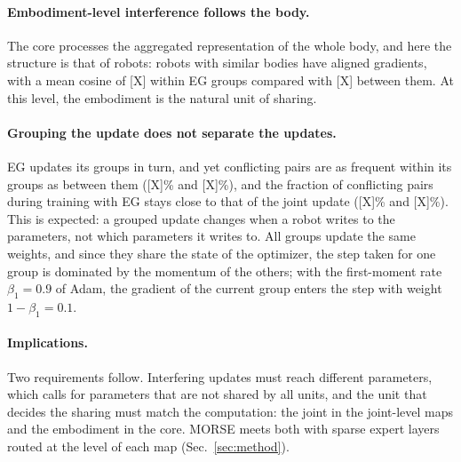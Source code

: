 \paragraph{Embodiment-level interference follows the body.}
The core processes the aggregated representation of the whole body, and here the structure is that of robots: robots
with similar bodies have aligned gradients, with a mean cosine of [X] within EG groups compared with [X] between them.
At this level, the embodiment is the natural unit of sharing.

\paragraph{Grouping the update does not separate the updates.}
EG updates its groups in turn, and yet conflicting pairs are as frequent within its groups as between them ([X]\% and
[X]\%), and the fraction of conflicting pairs during training with EG stays close to that of the joint update ([X]\%
and [X]\%). This is expected: a grouped update changes when a robot writes to the parameters, not which parameters it
writes to. All groups update the same weights, and since they share the state of the optimizer, the step taken for one
group is dominated by the momentum of the others; with the first-moment rate $\beta_1=0.9$ of Adam, the gradient of the
current group enters the step with weight $1-\beta_1=0.1$.

\paragraph{Implications.}
Two requirements follow. Interfering updates must reach different parameters, which calls for parameters that are not
shared by all units, and the unit that decides the sharing must match the computation: the joint in the joint-level
maps and the embodiment in the core. MORSE meets both with sparse expert layers routed at the level of each map
(Sec.~\ref{sec:method}).

